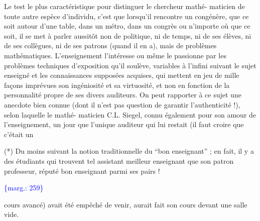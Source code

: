 \documentclass[11pt]{article}
\newcommand{\scanpage}[1]{\par\bigskip\noindent{\small\sffamily[scan #1]}\par}
\newcommand{\mspage}[1]{{\small\sffamily[p.\,#1]}}
\newcommand{\margin}[1]{\textcolor{blue}{\{\textsf{marg.:} #1\}}}
\begin{document}
Le test le plus caractéristique pour distinguer le chercheur mathé-%
maticien de toute autre espèce d'individu, c'est que lorsqu'il rencontre
un congénère, que ce soit autour d'une table, dans un métro, dans un congrès
ou n'importe où que ce soit, il se met à parler aussitôt non de politique,
ni de temps, ni de ses élèves, ni de ses collègues, ni de ses patrons (quand
il en a), mais de problèmes mathématiques. L'enseignement l'intéresse ou
même le passionne par les problèmes techniques d'exposition qu'il soulève,
variables à l'infini suivant le sujet enseigné et les connaissances supposées
acquises, qui mettent en jeu de mille façons imprévues son ingéniosité et
sa virtuosité, et non en fonction de la personnalité propre de ses divers
auditeurs. On peut rapporter à ce sujet une anecdote bien connue (dont il
n'est pas question de garantir l'authenticité !), selon laquelle le mathé-%
maticien C.L. Siegel, connu également pour son amour de l'enseignement,
un jour que l'unique auditeur qui lui restait (il faut croire que c'était un

(*) Du moins suivant la notion traditionnelle du ``bon enseignant'' ; en fait, il
y a des étudiants qui trouvent tel assistant meilleur enseignant que son
patron professeur, réputé bon enseignant parmi ses pairs !

\margin{259}

\clearpage
\scanpage{119/260}
\mspage{7}

cours avancé) avait été empêché de venir, aurait fait son cours devant une
salle vide.
\end{document}
